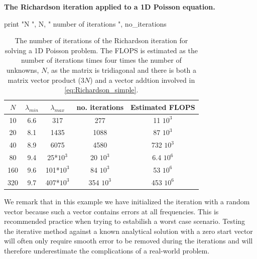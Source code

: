 \begin{example}{\textbf{The Richardson iteration applied to a  1D Poisson equation.}}
\begin{python}
  print "N ", N, " number of iterations ", no_iterations
 
\end{python}

\begin{table}[h]
\begin{center}
\begin{tabular}{|c|c|c|c|c|}  \hline
$N $ & $\lambda_{min}$ & $\lambda_{max}$& no. iterations & Estimated FLOPS \\ \hline
10 & 6.6  & 317   & 277 &  11 $10^3$      \\ \hline
20  & 8.1 & 1435  & 1088 & 87 $10^3$     \\ \hline
40  & 8.9 & 6075  &  4580 & 732  $10^3$   \\ \hline
80 & 9.4  & 25*$10^3$ & 20 $10^3$ & 6.4 $10^6$ \\ \hline 
160 & 9.6 & 101*$10^3$ & 84 $10^3$ & 53 $10^6$   \\ \hline  
320 & 9.7 & 407*$10^3$ & 354 $10^3$ & 453 $10^6$ \\ \hline 
\end{tabular}
\caption{The number of iterations of the Richardson iteration for 
solving a 1D Poisson problem. The FLOPS is estimated 
as the number of iterations times four times the number of unknowns, $N$, 
as the matrix is tridiagonal and there is both a matrix vector product (3$N$)
and a vector addtion involved in \eqref{eq:Richardson_simple}. }
\label{Richardson:norms}
\end{center}
\end{table}
We remark that in this example we have initialized the iteration with a random vector because
such a vector contains errors at all frequencies. This is recommended practice when 
trying to estabilish a worst case scenario. Testing the iterative method against a known analytical solution with 
a zero start vector will often only require smooth error to be removed during the iterations and will
therefore underestimate the complications of a real-world problem.   
\end{example}



